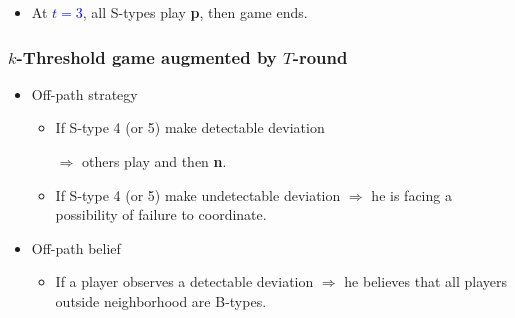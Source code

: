 \documentclass[8pt]{beamer}
\begin{document}
\begin{frame}
\begin{itemize}
\begin{itemize}
\pause
\item At \textcolor{blue}{$t=3$}, all S-types play \textbf{p}, then game ends.

\end{itemize}

\end{itemize}



\end{frame}


\begin{frame}
  \frametitle{$k$-Threshold game augmented by $T$-round }


\begin{itemize}

\item Off-path strategy
\begin{itemize}
\item If S-type 4 (or 5) make detectable deviation 

$\Rightarrow$ others play  and then \textbf{n}.
\item If S-type 4 (or 5) make undetectable deviation $\Rightarrow$ he is facing a possibility of failure to coordinate.
\end{itemize}
\item Off-path belief
\begin{itemize}
\item If a player observes a detectable deviation $\Rightarrow$ he believes that all players outside neighborhood are B-types. 
\end{itemize}
\end{itemize}



\end{frame}
\end{document}
